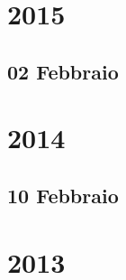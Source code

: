 \documentclass[12pt,a4paper]{report}
\begin{document}
 

\maketitle
\tableofcontents
 
\chapter{2015}
\section{02 Febbraio}
%
%
%
%
%
%
%
%

\chapter{2014}
\section{10 Febbraio}
%
%
%

%
%
%
%
%

\chapter{2013}



 
\end{document}
